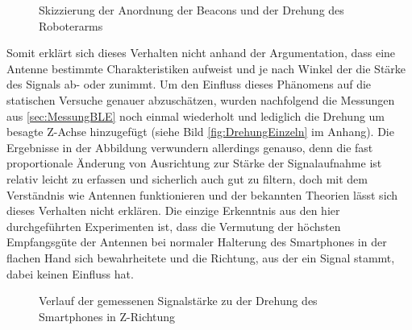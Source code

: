 \begin{figure}
\caption{Skizzierung der Anordnung der Beacons und der Drehung des Roboterarms}
\label{fig:DrehungSkizze}
\end{figure}
Somit erklärt sich dieses Verhalten nicht anhand der Argumentation, dass eine Antenne bestimmte Charakteristiken aufweist und je nach Winkel der die Stärke des Signals ab- oder zunimmt. Um den Einfluss dieses Phänomens auf die statischen Versuche genauer abzuschätzen, wurden nachfolgend die Messungen aus \ref{sec:MessungBLE} noch einmal wiederholt und lediglich die Drehung um besagte Z-Achse hinzugefügt (siehe Bild \ref{fig:DrehungEinzeln} im Anhang). Die Ergebnisse in der Abbildung verwundern allerdings genauso, denn die fast proportionale Änderung von Ausrichtung zur Stärke der Signalaufnahme ist relativ leicht zu erfassen und sicherlich auch gut zu filtern, doch mit dem Verständnis wie Antennen funktionieren und der bekannten Theorien lässt sich dieses Verhalten nicht erklären. Die einzige Erkenntnis aus den hier durchgeführten Experimenten ist, dass die Vermutung der höchsten Empfangsgüte der Antennen bei normaler Halterung des Smartphones in der flachen Hand sich bewahrheitete und die Richtung, aus der ein Signal stammt, dabei keinen Einfluss hat.
\begin{figure}[H] 
\centering
{}
\caption{Verlauf der gemessenen Signalstärke zu der Drehung des Smartphones in Z-Richtung}
\label{fig:DrehungAlle}
\end{figure}
